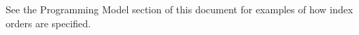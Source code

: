 

See the Programming Model section of this document
for examples of how index orders are specified.



